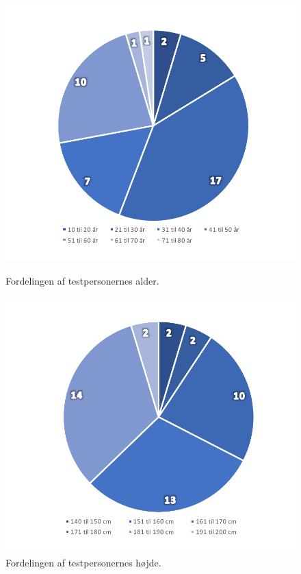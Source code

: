 \noindent
%
\begin{figure}[H]
\centering
\begin{minipage}{.5\textwidth}
  \centering
  \includegraphics[width=\linewidth]{Figure/DatabehandlingSkalaer/CirkelDiagramAlder}
  \caption{Fordelingen af testpersonernes alder.}
  \label{fig:CirkelDiagramCirkelDiagramAlder}
\end{minipage}%
\begin{minipage}{.5\textwidth}
  \centering
  \includegraphics[width=\linewidth]{Figure/DatabehandlingSkalaer/CirkelDiagramHoejde}
  \caption{Fordelingen af testpersonernes højde.}
  \label{fig:CirkelDiagramHoejde}
\end{minipage}
\end{figure}
\noindent
%